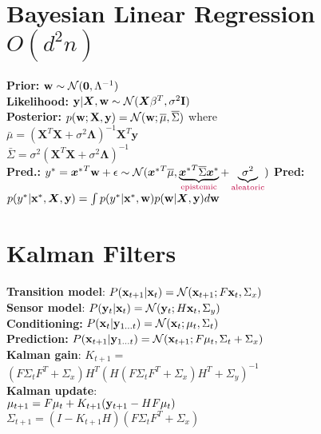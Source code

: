 \section{Bayesian Linear Regression $O(d^2n)$}
\textbf{Prior:} ${\mathbf{w}}\sim\mathcal{N}(\mathbf{0},\Lambda^{-1})$\\
\textbf{Likelihood:} ${\mathbf{y}}|{\bm{X}},{\mathbf{w}}\sim\mathcal{N}({\bm{X}}\beta^T,\sigma^2\mathbf{I})$\\
\textbf{Posterior:} $p({\mathbf{w}};\mathbf{X},\mathbf{y}) = \mathcal{N}({\mathbf{w}}; \overline\mu, \overline\Sigma)$ where\\
$\bar\mu = (\mathbf{X}^T\mathbf{X} +\sigma^2\bm{\Lambda})^{-1}\mathbf{X}^T\mathbf{y}$\\
$\bar\Sigma = \sigma^2(\mathbf{X}^T\mathbf{X} +\sigma^2\bm{\Lambda})^{-1}$\\
\textbf{Pred.:}
\mbox{$y^* = {{\bm{x}}^*}^T{\mathbf{w}} + \epsilon\sim \mathcal{N}({{\bm{x}}^*}^T\overline\mu, \underbrace{{{\bm{x}}^*}^T\overline\Sigma{{\bm{x}}^*}}_\text{\color{purple}epistemic}+\underbrace{\sigma^2}_\text{\color{purple}aleatoric})$}
\textbf{\color{gray}Pred:}
$p(y^*|{\mathbf{x}}^*,{\bm{X}},{\mathbf{y}}) = \int p(y^*|{\mathbf{x}}^*,{\mathbf{w}})p({\mathbf{w}}|{\bm{X}},{\mathbf{y}}) d{\mathbf{w}}$

\section{Kalman Filters}
\textbf{Transition model}:
\mbox{$P({\mathbf{x}}_{t+1}|{\mathbf{x}}_t)=\mathcal{N}({\mathbf{x}}_{t+1};F{\mathbf{x}}_t, \Sigma_x)$}\\
\textbf{Sensor model}:
$P({\mathbf{y}}_{t}|{\mathbf{x}}_t)=\mathcal{N}({\mathbf{y}}_{t};H{\mathbf{x}}_t, \Sigma_y)$\\
\textbf{Conditioning:} $P({\mathbf{x}}_t|{\mathbf{y}}_{1\ldots t}) = \mathcal{N}({\mathbf{x}}_t;\mu_t, \Sigma_t)$\\
\textbf{Prediction:} $P({\mathbf{x}}_{t+1}|{\mathbf{y}}_{1\ldots t}) = \mathcal{N}({\mathbf{x}}_{t+1};F\mu_t, \Sigma_t + \Sigma_x)$\\
\textbf{Kalman gain}:
$K_{t+1}=$\\$(F\Sigma_t F^T+\Sigma_x)H^T(H(F\Sigma_t F^T+\Sigma_x)H^T+ \Sigma_y)^{-1}$\\
\textbf{Kalman update}:\\
$\mu_{t+1}=F\mu_t+K_{t+1}({\mathbf{y}}_{t+1}-HF\mu_t)$\\
$\Sigma_{t+1}=(I-K_{t+1}H)(F\Sigma_tF^T + \Sigma_x)$\\

